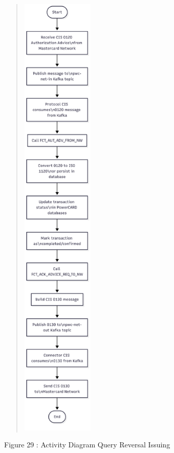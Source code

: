 \documentclass[12pt,a4paper]{report}
\begin{document}
\begin{quote}
\includegraphics[width=1.3531in,height=8.67532in]{vertopal_d1b0b2209edd4c6aa8254f57daa0953b/media/image48.png}
\end{quote}

\protect\hypertarget{_Toc201954505}{}{}Figure 29 : Activity Diagram
Query Reversal Issuing
\end{document}
